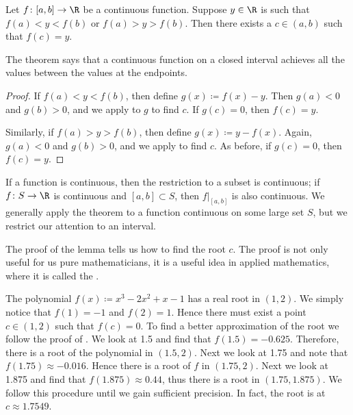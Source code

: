 \begin{thm} \label{IVT:thm}
Let $f \colon [a,b] \to \R$ be a continuous function.
Suppose $y \in \R$ is such that $f(a) < y < f(b)$
or $f(a) > y > f(b)$.  Then there exists a $c \in (a,b)$
such that $f(c) = y$.
\end{thm}

The theorem says that a continuous function on a closed interval
achieves all the values between the values at the endpoints.

\begin{proof}
If $f(a) < y < f(b)$, then define $g(x) \coloneqq f(x)-y$.  Then 
$g(a) < 0$ and $g(b) > 0$, and we apply 
to $g$ to find $c$.  If $g(c) = 0$, then $f(c) = y$.

Similarly, if $f(a) > y > f(b)$, then define $g(x) \coloneqq y-f(x)$.
Again, $g(a) < 0$ and $g(b) > 0$, and we apply  to
find $c$.
As before, if $g(c) = 0$, then $f(c) = y$.
\end{proof}

If a function is continuous, then the restriction
to a subset is continuous; if $f \colon S \to \R$ is continuous and
$[a,b] \subset S$, then $f|_{[a,b]}$ is also continuous.  We generally
apply the theorem to a function continuous on some large set $S$,
but we restrict our attention to an interval.


The proof of the lemma tells us how to find the root $c$.  The
proof is not only useful for us pure mathematicians,
it is a useful idea in applied mathematics,
where it is called the \emph{}.


\begin{example} %
The polynomial $f(x) \coloneqq x^3-2x^2+x-1$ has a real root in $(1,2)$.  We simply
notice that $f(1) = -1$ and $f(2) = 1$.  Hence there must exist a point $c
\in (1,2)$ such that $f(c) = 0$.  To find a better approximation of
the root we follow the proof of .  
We look at 1.5 and find that $f(1.5) = -0.625$.  Therefore,
there is a root of the polynomial in $(1.5,2)$.  Next we look at 1.75
and note that $f(1.75) \approx -0.016$.  Hence there is a root of $f$ in
$(1.75,2)$.  Next we look at 1.875 and find that $f(1.875) \approx 0.44$,
thus there is a root in $(1.75,1.875)$.  We follow this procedure until we gain
sufficient precision.  In fact, the root is at $c \approx 1.7549$.
\end{example}

